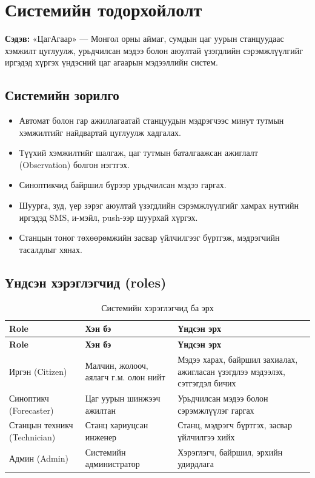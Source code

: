\documentclass[12pt,a4paper]{article}
\begin{document}
\section{Системийн тодорхойлолт}
\textbf{Сэдэв:} «ЦагАгаар» — Монгол орны аймаг, сумдын цаг уурын станцуудаас
хэмжилт цуглуулж, урьдчилсан мэдээ болон аюултай үзэгдлийн сэрэмжлүүлгийг
иргэдэд хүргэх үндэсний цаг агаарын мэдээллийн систем.

\subsection{Системийн зорилго}
\begin{itemize}
  \item Автомат болон гар ажиллагаатай станцуудын мэдрэгчээс минут тутмын хэмжилтийг найдвартай цуглуулж хадгалах.
  \item Түүхий хэмжилтийг шалгаж, цаг тутмын баталгаажсан ажиглалт (Observation) болгон нэгтгэх.
  \item Синоптикчид байршил бүрээр урьдчилсан мэдээ гаргах.
  \item Шуурга, зуд, үер зэрэг аюултай үзэгдлийн сэрэмжлүүлгийг хамрах нутгийн иргэдэд SMS, и-мэйл, push-ээр шуурхай хүргэх.
  \item Станцын тоног төхөөрөмжийн засвар үйлчилгээг бүртгэж, мэдрэгчийн тасалдлыг хянах.
\end{itemize}

\subsection{Үндсэн хэрэглэгчид (roles)}
\begin{longtable}{L{3.6cm}L{4.4cm}L{7.0cm}}
\caption{Системийн хэрэглэгчид ба эрх}\label{tab:roles}\\
\toprule
\textbf{Role} & \textbf{Хэн бэ} & \textbf{Үндсэн эрх}\\
\midrule
\endfirsthead
\toprule
\textbf{Role} & \textbf{Хэн бэ} & \textbf{Үндсэн эрх}\\
\midrule
\endhead
Иргэн (Citizen) & Малчин, жолооч, аялагч г.м. олон нийт & Мэдээ харах, байршил захиалах, ажигласан үзэгдлээ мэдээлэх, сэтгэгдэл бичих\\
Синоптикч (Forecaster) & Цаг уурын шинжээч ажилтан & Урьдчилсан мэдээ болон сэрэмжлүүлэг гаргах\\
Станцын техникч (Technician) & Станц хариуцсан инженер & Станц, мэдрэгч бүртгэх, засвар үйлчилгээ хийх\\
Админ (Admin) & Системийн администратор & Хэрэглэгч, байршил, эрхийн удирдлага\\
\bottomrule
\end{longtable}
\end{document}
